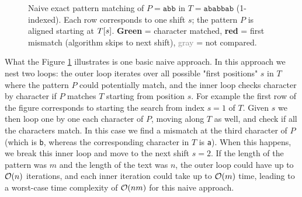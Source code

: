 \begin{figure}[H]
\caption{%
  Naive exact pattern matching of $P = \texttt{abb}$ in $T = \texttt{ababbab}$ (1-indexed).
  Each row corresponds to one shift $s$; the pattern $P$ is aligned starting at $T\kern0pt[s]$.
  \textcolor{green!45!black}{\textbf{Green}} = character matched,
  \textcolor{red!60!black}{\textbf{red}} = first mismatch (algorithm skips to next shift),
  \textcolor{gray}{gray} = not compared.
}
\label{fig:naive-matching}
\end{figure}


What the Figure \ref{fig:naive-matching} illustrates is one basic naive approach. In this approach we nest two loops: the outer loop iterates over all possible "first positions" $s$ in $T$ where the pattern $P$ could potentially match, and the inner loop checks character by character if $P$ matches $T$ starting from position $s$.
For example the first row of the figure corresponds to starting the search from index $s=1$ of $T$. Given $s$ we then loop one by one each character of $P$, moving along $T$ as well, and check if all the characters match. In this case we find a mismatch at the third character of $P$ (which is \texttt{b}, whereas the corresponding character in $T$ is \texttt{a}). When this happens, we break this inner loop and move to the next shift $s=2$.
If the length of the pattern was $m$ and the length of the text was $n$, the outer loop could have up to $\mathcal{O}\!\left(n\right)$ iterations, and each inner iteration could take up to $\mathcal{O}\!\left(m\right)$ time, leading to a worst-case time complexity of $\mathcal{O}\!\left(nm\right)$ for this naive approach.


